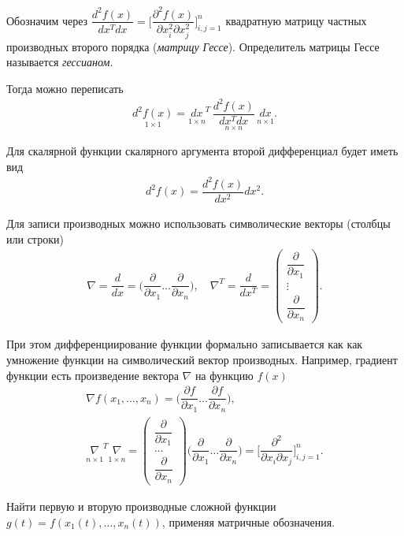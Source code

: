 \documentclass[%
	11pt,
	a4paper,
	utf8,
		]{article}
\begin{document}
Обозначим через $ \dfrac{d^2 f(x)}{dx^T dx} = \Big[ \dfrac{ \partial^2 f(x) }{ \partial x_i^2 \partial x_j^2 } \Big]_{i,j=1}^{n} $ квадратную матрицу частных производных второго порядка (\emph{матрицу Гессе}). Определитель матрицы Гессе называется \emph{гессианом}.

Тогда можно переписать
\begin{align*}
	\underset{1 \times 1}{d^2 f(x)} = \underset{1 \times n}{dx}^T \, \underset{n \times n}{\dfrac{ d^2 f(x) }{ dx^T dx }} \, \underset{n \times 1}{dx}.
\end{align*}

Для скалярной функции скалярного аргумента второй дифференциал будет иметь вид
\begin{align*}
	d^2 f(x) = \dfrac{d^2f(x)}{dx^2}dx^2.
\end{align*}

Для записи производных можно использовать символические векторы (столбцы или строки)
\begin{align*}
	\nabla = \dfrac{d}{dx} = \Big( \dfrac{\partial}{\partial x_1} \ldots \dfrac{\partial}{\partial x_n} \Big), \quad \nabla^T = \dfrac{d}{dx^T} =
	\begin{pmatrix}
		\dfrac{\partial}{\partial x_1} \\
		\vdots\\
		\dfrac{\partial}{\partial x_n}
	\end{pmatrix}.
\end{align*}

При этом дифференциирование функции формально записывается как как умножение функции на символический вектор производных. Например, градиент функции есть произведение вектора $ \nabla $ на функцию $ f(x) $
\begin{align*}
	\nabla f(x_1, \ldots, x_n) = \Big( \dfrac{ \partial f }{ \partial x_1 } \ldots \dfrac{ \partial f }{ \partial x_n }  \Big), \\
	\underset{n \times 1}{\nabla}^T \underset{1 \times n }{\nabla} =
	\begin{pmatrix}
		\dfrac{ \partial }{ \partial x_1 }\\
		\ldots \\
		\dfrac{ \partial }{ \partial x_n }
	\end{pmatrix}
    \Big( \dfrac{\partial}{\partial x_1} \ldots \dfrac{\partial}{\partial x_n} \Big) = \Bigg[ \dfrac{\partial^2}{\partial x_i \partial x_j} \Bigg]_{i, j=1}^n.
\end{align*}

Найти первую и вторую производные сложной функции $ g(t) = f(x_1(t), \ldots, x_n(t)) $, применяя матричные обозначения.
\end{document}
